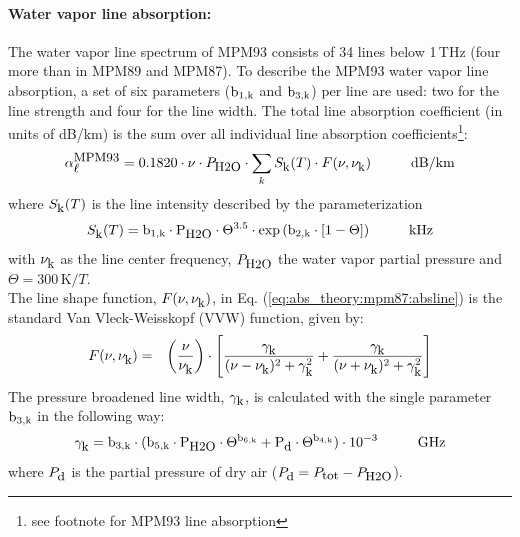 \paragraph{Water vapor line absorption:}
\label{levele:mpm93_h2olines}
The water vapor line spectrum of MPM93 \citep{liebeetal:93} 
consists of 34 lines below 1\,THz (four more than in MPM89 and MPM87). 
To describe the MPM93 water vapor line absorption, a set of six parameters 
($\rm b_{\rm 1,k}$ and $\rm b_{\rm 3,k}$) per line are used: two for the line strength and 
four for the line width. The total line absorption coefficient 
(in units of dB/km) is the sum over all individual line absorption 
coefficients\footnote{see footnote for MPM93 line absorption}:
\begin{equation}
  \label{eq:abs_theory:mpm93:absline}
  \alphampmnl = 0.1820 \cdot \nu \cdot \phzo \cdot 
  \sum_{k}{\inten \cdot \shape}\hspace*{10mm}\mbox{dB/km}
\end{equation}
where $S_{\mbox{\rm \small k}}(T)$ is the line intensity described by the parameterization
\begin{equation}
  \label{eq:abs_theory:mpm93:strength}
  \inten = \bek \cdot \phzo \cdot \Theta^{3.5} 
           \cdot \exp{(\bzk \cdot [1-\Theta])}\hspace*{10mm}\mbox{kHz}
\end{equation}
with $\nu_{\mbox{\rm \small k}}$ as the line center frequency, $P_{\mbox{\rm \small H2O}}$ the water
vapor partial pressure and $\Theta = 300\,\mbox{K}/T$.\\
The line shape function, $F(\nu,\nu_{\mbox{\rm \small k}})$, in Eq. (\ref{eq:abs_theory:mpm87:absline}) 
is the standard Van Vleck-Weisskopf (VVW) function, given by:
\begin{eqnarray}
  \label{eq:abs_theory:mpm93:VVW}
  F(\nu,\nu_{\mbox{\rm \small k}}) & = & \left(\frac{\nu}{\nu_{\mbox{\rm \small k}}}\right) \cdot 
               \left[\frac{\gamma_{\mbox{\rm \small k}}}{(\nu - \nu_{\mbox{\rm \small k}})^2 + \gamma_{\mbox{\rm \small k}}^2} + 
                     \frac{\gamma_{\mbox{\rm \small k}}}{(\nu + \nu_{\mbox{\rm \small k}})^2 + \gamma_{\mbox{\rm \small k}}^2}\right]\\
\end{eqnarray}
The pressure broadened line width, $\gamma_{\mbox{\rm \small k}}$, is calculated with the 
single parameter $\rm b_{\rm 3,k}$ in the following way:
\begin{equation}
  \label{eq:abs_theory:mpm93:gamma}
  \gamk = \bdk \cdot 
         (\bfk \cdot \phzo \cdot \Theta^{\bsk} +
                     \pda  \cdot \Theta^{\bvk})
        \cdot 10^{-3}\hspace*{10mm}\mbox{GHz}
\end{equation}
where $P_{\mbox{\rm \small d}}$ is the partial pressure of dry air ($P_{\mbox{\rm \small d}}=P_{\mbox{\rm \small tot}}-P_{\mbox{\rm \small H2O}}$). 

